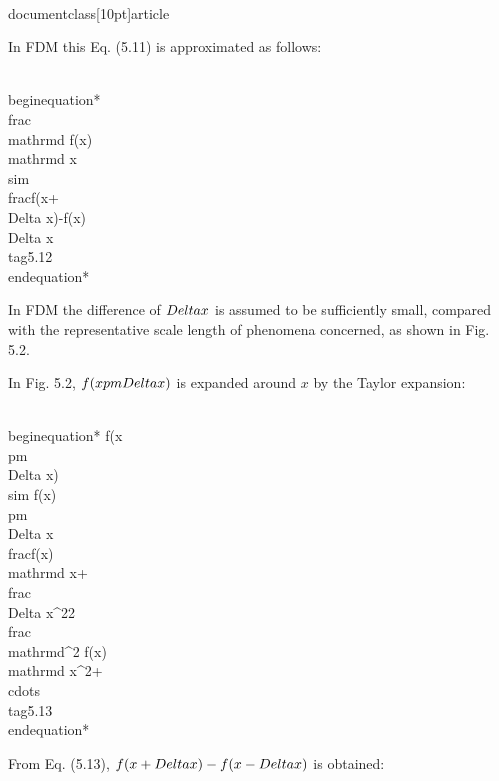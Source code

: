 \\documentclass[10pt]{article}
\begin{document}
In FDM this Eq. (5.11) is approximated as follows:


\\begin{equation*}
\\frac{\\mathrm{d} f(x)}{\\mathrm{d} x} \\sim \\frac{f(x+\\Delta x)-f(x)}{\\Delta x} \\tag{5.12}
\\end{equation*}


In FDM the difference of $\\Delta x$ is assumed to be sufficiently small, compared with the representative scale length of phenomena concerned, as shown in Fig. 5.2.

In Fig. 5.2, $f(x \\pm \\Delta x)$ is expanded around $x$ by the Taylor expansion:


\\begin{equation*}
f(x \\pm \\Delta x) \\sim f(x) \\pm \\Delta x \\frac{f(x)}{\\mathrm{d} x}+\\frac{\\Delta x^{2}}{2} \\frac{\\mathrm{d}^{2} f(x)}{\\mathrm{d} x^{2}}+\\cdots \\tag{5.13}
\\end{equation*}


From Eq. (5.13), $f(x+\\Delta x)-f(x-\\Delta x)$ is obtained:
\end{document}
